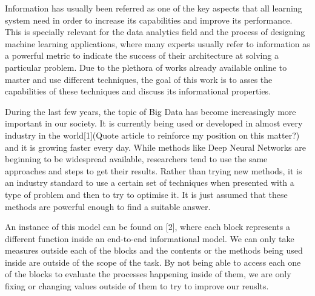 \documentclass[12pt]{report}
\begin{document}
Information has usually been referred as one of the key aspects that all learning system need in order to increase its capabilities and improve its performance. This is specially relevant for the data analytics field and the process of designing machine learning applications, where many experts usually refer to information as a powerful metric to indicate the success of their architecture at solving a particular problem. Due to the plethora of works already available online to master and use different techniques, the goal of this work is to asses the capabilities of these techniques and discuss its informational properties. \par
\setlength{\parindent}{10ex}
During the last few years, the topic of Big Data has become increasingly more important in our society. It is currently being used or developed in almost every industry in the world[1](Quote article to reinforce my position on this matter?) and it is growing faster every day. While methods like Deep Neural Networks are beginning to be widespread available,  researchers tend to use the same approaches and steps to get their results. Rather than trying new methods, it is an industry standard to use a certain set of techniques when presented with a type of problem and then to try to optimise it. It is just assumed that these methods are powerful enough to find a suitable answer.  \par
An instance of this model can be found on [2], where each block represents a different function inside an end-to-end informational model. We can only take measures outside each of the blocks and the contents or the methods being used inside are outside of the scope of the task. By not being able to access each one of the blocks to evaluate the processes happening inside of them, we are only fixing or changing values outside of them to try to improve our reuslts. \par
\end{document}
